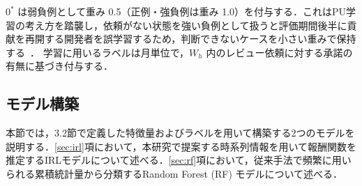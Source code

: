 \documentclass[submit,noauthor,ses,dvipdfmx]{ipsj}
\begin{document}
$0^*$ は弱負例として重み 0.5（正例・強負例は重み 1.0）を付与する．これはPU学習の考え方を踏襲し，依頼がない状態を強い負例として扱うと評価期間後半に貢献を再開する開発者を誤学習するため，判断できないケースを小さい重みで保持する~\cite{elkan_noto}．
学習に用いるラベルは月単位で，$W_h$ 内のレビュー依頼に対する承諾の有無に基づき付与する．



\vspace{-2mm}
\subsection{モデル構築}

本節では，3.2節で定義した特徴量およびラベルを用いて構築する2つのモデルを説明する．\ref{sec:irl}項において，本研究で提案する時系列情報を用いて報酬関数を推定するIRLモデルについて述べる．\ref{sec:rf}項において，従来手法で頻繁に用いられる累積統計量から分類するRandom Forest (RF) モデルについて述べる．
\end{document}
